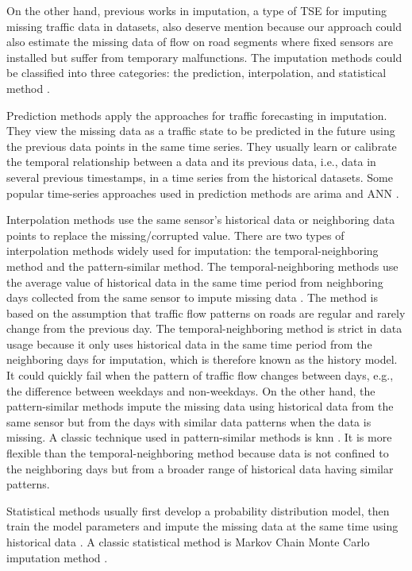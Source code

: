 \documentclass[english]{kththesis}
\begin{document}
On the other hand, previous works in imputation, a type of TSE for imputing missing traffic data in datasets, also deserve mention because our approach could also estimate the missing data of flow on road segments where fixed sensors are installed but suffer from temporary malfunctions. The imputation methods could be classified into three categories: the prediction, interpolation, and statistical method \cite{duan_dl_imputation, zhuang_cnn_imputation}.

Prediction methods apply the approaches for traffic forecasting in imputation. They view the missing data as a traffic state to be predicted in the future using the previous data points in the same time series. They usually learn or calibrate the temporal relationship between a data and its previous data, i.e., data in several previous timestamps, in a time series from the historical datasets. Some popular time-series approaches used in prediction methods are \gls{arima} and ANN \cite{duan_dl_imputation}.

Interpolation methods use the same sensor's historical data or neighboring data points to replace the missing/corrupted value. There are two types of interpolation methods widely used for imputation: the temporal-neighboring method and the pattern-similar method. The temporal-neighboring methods use the average value of historical data in the same time period from neighboring days collected from the same sensor to impute missing data \cite{zhong_interpolation_temporal_imputation}. The method is based on the assumption that traffic flow patterns on roads are regular and rarely change from the previous day. The temporal-neighboring method is strict in data usage because it only uses historical data in the same time period from the neighboring days for imputation, which is therefore known as the history model. It could quickly fail when the pattern of traffic flow changes between days, e.g., the difference between weekdays and non-weekdays. On the other hand, the pattern-similar methods impute the missing data using historical data from the same sensor but from the days with similar data patterns when the data is missing. A classic technique used in pattern-similar methods is \gls{knn} \cite{liu_pattern_knn_imputation}. It is more flexible than the temporal-neighboring method because data is not confined to the neighboring days but from a broader range of historical data having similar patterns. 

Statistical methods usually first develop a probability distribution model, then train the model parameters and impute the missing data at the same time using historical data \cite{zhuang_cnn_imputation}. A classic statistical method is Markov Chain Monte Carlo imputation method \cite{ni_markov}.
\end{document}
